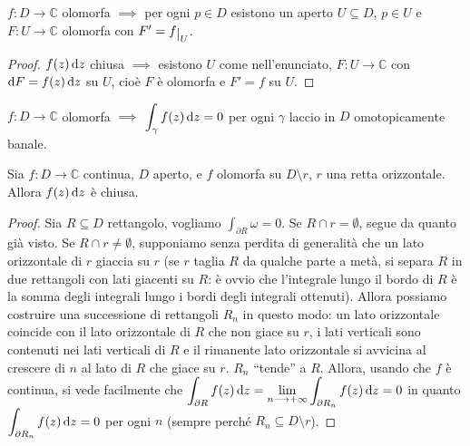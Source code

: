 \begin{cor}
  $f:D \longrightarrow \mathbb{C}$ olomorfa $\implies$ per ogni $p \in D$ esistono un aperto $U \subseteq D$, $p \in U$ e $F:U \longrightarrow \mathbb{C}$ olomorfa con $F'=f\restrict{U}$.
\end{cor}

\begin{proof}
  $f(z)\mathop{}\!\mathrm{d} z$ chiusa $\implies$ esistono $U$ come nell'enunciato, $F:U \longrightarrow \mathbb{C}$ con  $\mathop{}\!\mathrm{d} F=f(z)\mathop{}\!\mathrm{d} z$ su $U$, cioè $F$ è olomorfa e $F'=f$ su $U$.
\end{proof}

\begin{cor}
  $f:D \longrightarrow \mathbb{C}$ olomorfa $\implies$ $\displaystyle \int_{\gamma} f(z)\mathop{}\!\mathrm{d} z=0$ per ogni $\gamma$ laccio in $D$ omotopicamente banale.
\end{cor}

\begin{prop} \label{retta_orizzontale}
  Sia $f:D \longrightarrow \mathbb{C}$ continua, $D$ aperto, e $f$ olomorfa su $D \setminus r$, $r$ una retta orizzontale. Allora $f(z)\mathop{}\!\mathrm{d} z$ è chiusa.
\end{prop}

\begin{proof}
  Sia $R \subseteq D$ rettangolo, vogliamo $\displaystyle \int_{\partial R} \omega=0$. Se $R \cap r=\emptyset$, segue da quanto già visto. Se $R \cap r\not=\emptyset$, supponiamo senza perdita di generalità che un lato orizzontale di $r$ giaccia su $r$ (se $r$ taglia $R$ da qualche parte a metà, si separa $R$ in due rettangoli con lati giacenti su $R$: è ovvio che l'integrale lungo il bordo di $R$ è la somma degli integrali lungo i bordi degli integrali ottenuti). Allora possiamo costruire una successione di rettangoli $R_n$ in questo modo: un lato orizzontale coincide con il lato orizzontale di $R$ che non giace su $r$, i lati verticali sono contenuti nei lati verticali di $R$ e il rimanente lato orizzontale si avvicina al crescere di $n$ al lato di $R$ che giace su $r$.
  $R_n$ ``tende'' a $R$. Allora, usando che $f$ è continua, si vede facilmente che $\displaystyle \int_{\partial R} f(z)\mathop{}\!\mathrm{d} z=\lim_{n \longrightarrow +\infty} \int_{\partial R_n} f(z)\mathop{}\!\mathrm{d} z=0$ in quanto $\displaystyle \int_{\partial R_n} f(z)\mathop{}\!\mathrm{d} z=0$ per ogni $n$ (sempre perché $R_n \subseteq D \setminus r$).
\end{proof}

